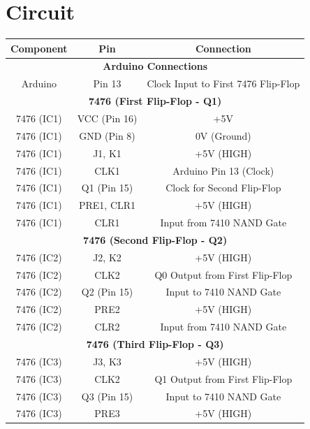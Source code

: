 \documentclass[12pt,a4paper]{article}
\begin{document}
\section{Circuit}
\begin{table}[H]
    \centering
    \renewcommand{\arraystretch}{1.2}
    \begin{tabular}{|c|c|c|}
        \hline
        \textbf{Component} & \textbf{Pin} & \textbf{Connection} \\
        \hline
        \multicolumn{3}{|c|}{\textbf{Arduino Connections}} \\
        \hline
        Arduino & Pin 13 & Clock Input to First 7476 Flip-Flop \\
        \hline
        \multicolumn{3}{|c|}{\textbf{7476 (First Flip-Flop - Q1)}} \\
        \hline
        7476 (IC1) & VCC (Pin 16) & +5V \\
        7476 (IC1) & GND (Pin 8) & 0V (Ground) \\
        7476 (IC1) & J1, K1 & +5V (HIGH) \\
        7476 (IC1) & CLK1 & Arduino Pin 13 (Clock) \\
        7476 (IC1) & Q1 (Pin 15) & Clock for Second Flip-Flop \\
        7476 (IC1) & PRE1, CLR1 & +5V (HIGH) \\
        7476 (IC1) & CLR1 & Input from 7410 NAND Gate\\
        \hline
        \multicolumn{3}{|c|}{\textbf{7476 (Second Flip-Flop - Q2)}} \\
        \hline
        7476 (IC2) & J2, K2 & +5V (HIGH) \\
        7476 (IC2) & CLK2 & Q0 Output from First Flip-Flop \\
        7476 (IC2) & Q2 (Pin 15) & Input to 7410 NAND Gate \\
        7476 (IC2) & PRE2 & +5V (HIGH) \\
        7476 (IC2) & CLR2 & Input from 7410 NAND Gate\\
        \hline
        \multicolumn{3}{|c|}{\textbf{7476 (Third Flip-Flop - Q3)}} \\
        \hline
        7476 (IC3) & J3, K3 & +5V (HIGH) \\
        7476 (IC3) & CLK2 & Q1 Output from First Flip-Flop \\
        7476 (IC3) & Q3 (Pin 15) & Input to 7410 NAND Gate \\
        7476 (IC3) & PRE3 & +5V (HIGH) \\

\end{tabular}
\end{table}
\end{document}
